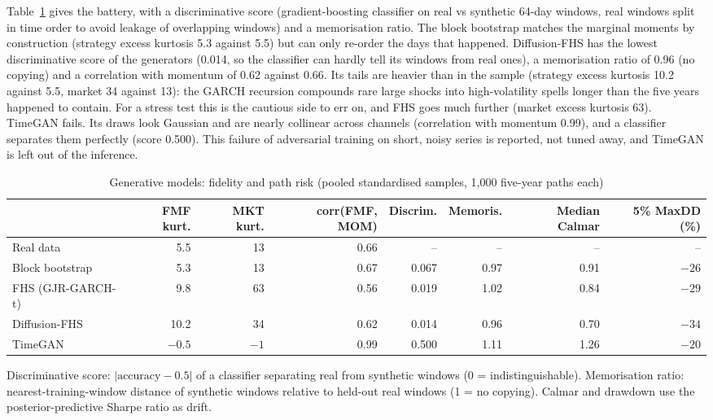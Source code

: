  Table~\ref{tab:generative} gives the battery, with a discriminative score (gradient-boosting classifier on real vs synthetic 64-day windows, real windows split in time order to avoid leakage of overlapping windows) and a memorisation ratio. The block bootstrap matches the marginal moments by construction (strategy excess kurtosis 5.3 against 5.5) but can only re-order the days that happened. Diffusion-FHS has the lowest discriminative score of the generators (0.014, so the classifier can hardly tell its windows from real ones), a memorisation ratio of 0.96 (no copying) and a correlation with momentum of 0.62 against 0.66. Its tails are heavier than in the sample (strategy excess kurtosis 10.2 against 5.5, market 34 against 13): the GARCH recursion compounds rare large shocks into high-volatility spells longer than the five years happened to contain. For a stress test this is the cautious side to err on, and FHS goes much further (market excess kurtosis 63). TimeGAN fails. Its draws look Gaussian and are nearly collinear across channels (correlation with momentum 0.99), and a classifier separates them perfectly (score 0.500). This failure of adversarial training on short, noisy series is reported, not tuned away, and TimeGAN is left out of the inference.

\begin{table}[t]
\centering\footnotesize
\caption{Generative models: fidelity and path risk (pooled standardised samples, 1,000 five-year paths each)}\label{tab:generative}
\begin{adjustbox}{max width=\textwidth}\begin{tabular}{lrrrrrrr}
\toprule
 & FMF kurt. & MKT kurt. & corr(FMF, MOM) & Discrim. & Memoris. & Median Calmar & 5\% MaxDD (\%)\\
\midrule
Real data & 5.5 & 13 & 0.66 & -- & -- & -- & --\\
Block bootstrap & 5.3 & 13 & 0.67 & 0.067 & 0.97 & 0.91 & $-26$\\
FHS (GJR-GARCH-t) & 9.8 & 63 & 0.56 & 0.019 & 1.02 & 0.84 & $-29$\\
Diffusion-FHS & 10.2 & 34 & 0.62 & 0.014 & 0.96 & 0.70 & $-34$\\
TimeGAN & $-0.5$ & $-1$ & 0.99 & 0.500 & 1.11 & 1.26 & $-20$\\
\bottomrule
\end{tabular}\end{adjustbox}
\par\smallskip\begin{minipage}{0.97\textwidth}\footnotesize Discriminative score: $|\text{accuracy}-0.5|$ of a classifier separating real from synthetic windows (0 = indistinguishable). Memorisation ratio: nearest-training-window distance of synthetic windows relative to held-out real windows (1 = no copying). Calmar and drawdown use the posterior-predictive Sharpe ratio as drift.\end{minipage}
\end{table}

